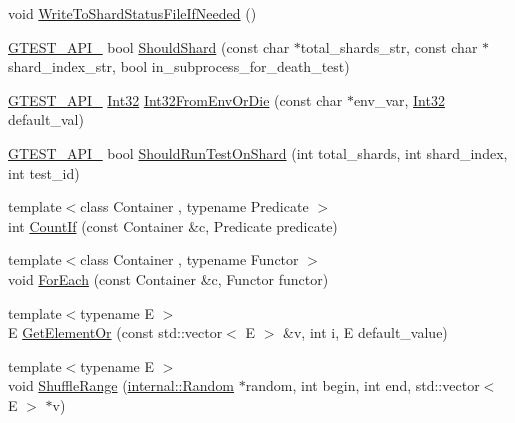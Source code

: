 \begin{DoxyCompactItemize}
\item 
void \hyperlink{namespacetesting_1_1internal_a19b35b39782d41e6ef76e1910a3a502e}{Write\+To\+Shard\+Status\+File\+If\+Needed} ()
\item 
\hyperlink{gtest-port_8h_aa73be6f0ba4a7456180a94904ce17790}{G\+T\+E\+S\+T\+\_\+\+A\+P\+I\+\_\+} bool \hyperlink{namespacetesting_1_1internal_a0fe41657b1d1ab7ec4e37ec07403ee6c}{Should\+Shard} (const char $\ast$total\+\_\+shards\+\_\+str, const char $\ast$shard\+\_\+index\+\_\+str, bool in\+\_\+subprocess\+\_\+for\+\_\+death\+\_\+test)
\item 
\hyperlink{gtest-port_8h_aa73be6f0ba4a7456180a94904ce17790}{G\+T\+E\+S\+T\+\_\+\+A\+P\+I\+\_\+} \hyperlink{namespacetesting_1_1internal_a8ee38faaf875f133358abaf9bc056cec}{Int32} \hyperlink{namespacetesting_1_1internal_aaa576613655c2f380278c255c3ec5fef}{Int32\+From\+Env\+Or\+Die} (const char $\ast$env\+\_\+var, \hyperlink{namespacetesting_1_1internal_a8ee38faaf875f133358abaf9bc056cec}{Int32} default\+\_\+val)
\item 
\hyperlink{gtest-port_8h_aa73be6f0ba4a7456180a94904ce17790}{G\+T\+E\+S\+T\+\_\+\+A\+P\+I\+\_\+} bool \hyperlink{namespacetesting_1_1internal_a437bd89f5bc532778d7467600e210395}{Should\+Run\+Test\+On\+Shard} (int total\+\_\+shards, int shard\+\_\+index, int test\+\_\+id)
\item 
{\footnotesize template$<$class Container , typename Predicate $>$ }\\int \hyperlink{namespacetesting_1_1internal_a1e77a774d910346eff11a86d8df783a5}{Count\+If} (const Container \&c, Predicate predicate)
\item 
{\footnotesize template$<$class Container , typename Functor $>$ }\\void \hyperlink{namespacetesting_1_1internal_a52f5504ed65d116201ccb8f99a44fd7e}{For\+Each} (const Container \&c, Functor functor)
\item 
{\footnotesize template$<$typename E $>$ }\\E \hyperlink{namespacetesting_1_1internal_a71fdd20a0686bea3dc0cdcd95e0bca1c}{Get\+Element\+Or} (const std\+::vector$<$ E $>$ \&v, int i, E default\+\_\+value)
\item 
{\footnotesize template$<$typename E $>$ }\\void \hyperlink{namespacetesting_1_1internal_a0e1d3dc36138a591769412d4c7779861}{Shuffle\+Range} (\hyperlink{classtesting_1_1internal_1_1_random}{internal\+::\+Random} $\ast$random, int begin, int end, std\+::vector$<$ E $>$ $\ast$v)
\item 

\end{DoxyCompactItemize}
